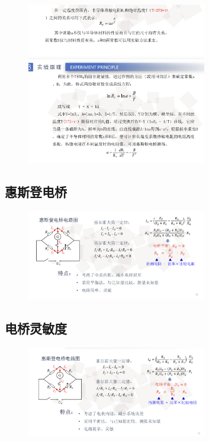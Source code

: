 \documentclass{article}
\begin{document}
\begin{figure}[H]
    \centering
    \includegraphics[width=0.7\textwidth]{2.png}

\end{figure}

\subsection*{惠斯登电桥}

\begin{figure}[H]
    \centering
    \includegraphics[width=0.7\textwidth]{3.png}

\end{figure}

\subsection*{电桥灵敏度}

\begin{figure}[H]
    \centering
    \includegraphics[width=0.7\textwidth]{4.png}
    
\end{figure}
\end{document}
